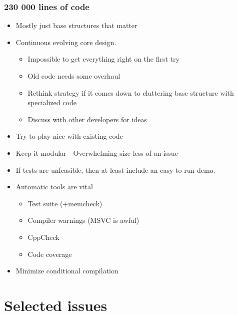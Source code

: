 \documentclass[11pt]{beamer} %
\begin{document}
\begin{frame}
 \frametitle{230 000 lines of code}
\begin{itemize}
 \item Mostly just base structures that matter
 \item Continuous evolving core design.
  \begin{itemize}
    \item Impossible to get everything right on the first try
    \item Old code needs some overhaul
    \item Rethink strategy if it comes down to cluttering base structure with specialized code
    \item Discuss with other developers for ideas
  \end{itemize}
 \item Try to play nice with existing code
 \item Keep it modular - Overwhelming size less of an issue
 \item If tests are unfeasible, then at least include an easy-to-run demo.
 \item Automatic tools are vital
  \begin{itemize}
   \item Test suite (+memcheck)
   \item Compiler warnings (MSVC is awful)
   \item CppCheck
   \item Code coverage
  \end{itemize}
 \item Minimize conditional compilation 
\end{itemize}
\end{frame}

\section{Selected issues}
\end{document}
